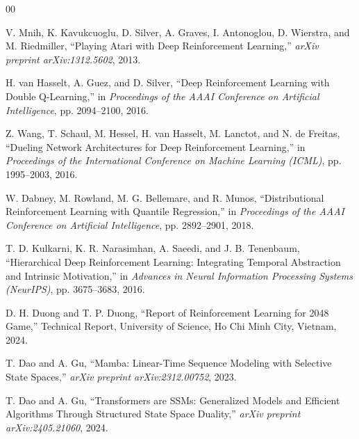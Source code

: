 \documentclass[conference]{IEEEtran}
\begin{document}
\begin{thebibliography}{00}

V. Mnih, K. Kavukcuoglu, D. Silver, A. Graves, I. Antonoglou, D. Wierstra, and M. Riedmiller, ``Playing Atari with Deep Reinforcement Learning,'' \textit{arXiv preprint arXiv:1312.5602}, 2013.

H. van Hasselt, A. Guez, and D. Silver, ``Deep Reinforcement Learning with Double Q-Learning,'' in \textit{Proceedings of the AAAI Conference on Artificial Intelligence}, pp. 2094--2100, 2016.

Z. Wang, T. Schaul, M. Hessel, H. van Hasselt, M. Lanctot, and N. de Freitas, ``Dueling Network Architectures for Deep Reinforcement Learning,'' in \textit{Proceedings of the International Conference on Machine Learning (ICML)}, pp. 1995--2003, 2016.

W. Dabney, M. Rowland, M. G. Bellemare, and R. Munos, ``Distributional Reinforcement Learning with Quantile Regression,'' in \textit{Proceedings of the AAAI Conference on Artificial Intelligence}, pp. 2892--2901, 2018.

T. D. Kulkarni, K. R. Narasimhan, A. Saeedi, and J. B. Tenenbaum, ``Hierarchical Deep Reinforcement Learning: Integrating Temporal Abstraction and Intrinsic Motivation,'' in \textit{Advances in Neural Information Processing Systems (NeurIPS)}, pp. 3675--3683, 2016.

D. H. Duong and T. P. Duong, ``Report of Reinforcement Learning for 2048 Game,'' Technical Report, University of Science, Ho Chi Minh City, Vietnam, 2024.

T. Dao and A. Gu, ``Mamba: Linear-Time Sequence Modeling with Selective State Spaces,'' \textit{arXiv preprint arXiv:2312.00752}, 2023.

T. Dao and A. Gu, ``Transformers are SSMs: Generalized Models and Efficient Algorithms Through Structured State Space Duality,'' \textit{arXiv preprint arXiv:2405.21060}, 2024.

\end{thebibliography}
\end{document}
